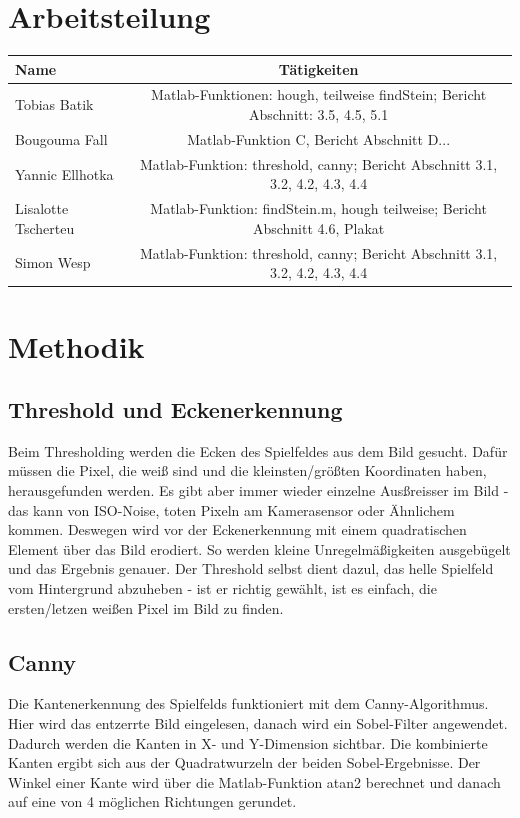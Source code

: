\documentclass[paper=A4, deutsch]{scrartcl}
\begin{document}
\section{Arbeitsteilung}
\begin{center}
  \begin{tabular}{ |l | c | }
    \hline
  Name & Tätigkeiten\\
    \hline
			Tobias Batik & Matlab-Funktionen: hough, teilweise findStein; Bericht Abschnitt: 3.5, 4.5, 5.1\\
		\hline
			Bougouma Fall & Matlab-Funktion C, Bericht Abschnitt D...\\
		\hline
			Yannic Ellhotka & Matlab-Funktion: threshold, canny; Bericht Abschnitt 3.1, 3.2, 4.2, 4.3, 4.4\\
		\hline
			Lisalotte Tscherteu & Matlab-Funktion: findStein.m, hough teilweise; Bericht Abschnitt 4.6, Plakat\\
		\hline
			Simon Wesp & Matlab-Funktion: threshold, canny; Bericht Abschnitt 3.1, 3.2, 4.2, 4.3, 4.4\\
		\hline
  \end{tabular}
\end{center}


\section{Methodik}

\subsection{Threshold und Eckenerkennung}
Beim Thresholding werden die Ecken des Spielfeldes aus dem Bild gesucht. Dafür müssen die Pixel, die weiß sind und die kleinsten/größten Koordinaten haben, herausgefunden werden. Es gibt aber immer wieder einzelne Ausßreisser im Bild - das kann von ISO-Noise, toten Pixeln am Kamerasensor oder Ähnlichem kommen. Deswegen wird vor der Eckenerkennung mit einem quadratischen Element über das Bild erodiert. So werden kleine Unregelmäßigkeiten ausgebügelt und das Ergebnis genauer. Der Threshold selbst dient dazul, das helle Spielfeld vom Hintergrund abzuheben - ist er richtig gewählt, ist es einfach, die ersten/letzen weißen Pixel im Bild zu finden.

\subsection{Canny}
Die Kantenerkennung des Spielfelds funktioniert mit dem Canny-Algorithmus. Hier wird das entzerrte Bild eingelesen, danach wird ein Sobel-Filter angewendet. Dadurch werden die Kanten in X- und Y-Dimension sichtbar. Die kombinierte Kanten ergibt sich aus der Quadratwurzeln der beiden Sobel-Ergebnisse. Der Winkel einer Kante wird über die Matlab-Funktion atan2 berechnet und danach auf eine von 4 möglichen Richtungen gerundet. \\
\end{document}
